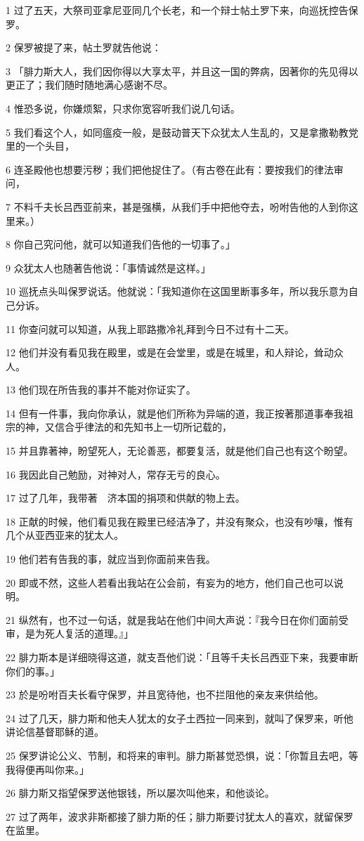 \par 1 过了五天，大祭司亚拿尼亚同几个长老，和一个辩士帖土罗下来，向巡抚控告保罗。
\par 2 保罗被提了来，帖土罗就告他说：
\par 3 「腓力斯大人，我们因你得以大享太平，并且这一国的弊病，因著你的先见得以更正了；我们随时随地满心感谢不尽。
\par 4 惟恐多说，你嫌烦絮，只求你宽容听我们说几句话。
\par 5 我们看这个人，如同瘟疫一般，是鼓动普天下众犹太人生乱的，又是拿撒勒教党里的一个头目，
\par 6 连圣殿他也想要污秽；我们把他捉住了。（有古卷在此有：要按我们的律法审问，
\par 7 不料千夫长吕西亚前来，甚是强横，从我们手中把他夺去，吩咐告他的人到你这里来。）
\par 8 你自己究问他，就可以知道我们告他的一切事了。」
\par 9 众犹太人也随著告他说：「事情诚然是这样。」
\par 10 巡抚点头叫保罗说话。他就说：「我知道你在这国里断事多年，所以我乐意为自己分诉。
\par 11 你查问就可以知道，从我上耶路撒冷礼拜到今日不过有十二天。
\par 12 他们并没有看见我在殿里，或是在会堂里，或是在城里，和人辩论，耸动众人。
\par 13 他们现在所告我的事并不能对你证实了。
\par 14 但有一件事，我向你承认，就是他们所称为异端的道，我正按著那道事奉我祖宗的神，又信合乎律法的和先知书上一切所记载的，
\par 15 并且靠著神，盼望死人，无论善恶，都要复活，就是他们自己也有这个盼望。
\par 16 我因此自己勉励，对神对人，常存无亏的良心。
\par 17 过了几年，我带著　济本国的捐项和供献的物上去。
\par 18 正献的时候，他们看见我在殿里已经洁净了，并没有聚众，也没有吵嚷，惟有几个从亚西亚来的犹太人。
\par 19 他们若有告我的事，就应当到你面前来告我。
\par 20 即或不然，这些人若看出我站在公会前，有妄为的地方，他们自己也可以说明。
\par 21 纵然有，也不过一句话，就是我站在他们中间大声说：『我今日在你们面前受审，是为死人复活的道理。』」
\par 22 腓力斯本是详细晓得这道，就支吾他们说：「且等千夫长吕西亚下来，我要审断你们的事。」
\par 23 於是吩咐百夫长看守保罗，并且宽待他，也不拦阻他的亲友来供给他。
\par 24 过了几天，腓力斯和他夫人犹太的女子土西拉一同来到，就叫了保罗来，听他讲论信基督耶稣的道。
\par 25 保罗讲论公义、节制，和将来的审判。腓力斯甚觉恐惧，说：「你暂且去吧，等我得便再叫你来。」
\par 26 腓力斯又指望保罗送他银钱，所以屡次叫他来，和他谈论。
\par 27 过了两年，波求非斯都接了腓力斯的任；腓力斯要讨犹太人的喜欢，就留保罗在监里。

